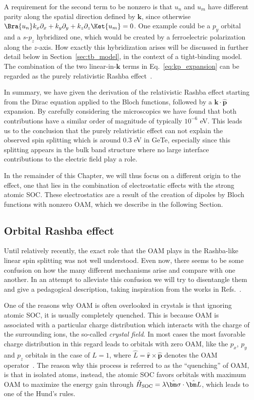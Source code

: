A requirement for the second term to be nonzero is that $u_n$ and $u_m$ have different parity along the spatial direction defined by $\bm{k}$, since otherwise $\Bra{u_n} k_x \partial_x + k_y \partial_y + k_z \partial_z \Ket{u_m} = 0$.
One example could be a $p_y$ orbital and a $s$-$p_z$ hybridized one, which would be created by a ferroelectric polarization along the $z$-axis.
How exactly this hybridization arises will be discussed in further detail below in Section~\ref{sec:tb_model}, in the context of a tight-binding model.
The combination of the two linear-in-$\bm{k}$ terms in Eq.~\eqref{eq:kp_expansion} can be regarded as the purely relativistic Rashba effect~\cite{Bahramy2011}.
    
In summary, we have given the derivation of the relativistic Rashba effect starting from the Dirac equation applied to the Bloch functions, followed by a $\bm k \cdot \hat{\bm p}$ expansion.
By carefully considering the microscopics we have found that both contributions have a similar order of magnitude of typically $10^{-6}$ eV.
This leads us to the conclusion that the purely relativistic effect can not explain the observed spin splitting which is around 0.3 eV in GeTe, especially since this splitting appears in the bulk band structure where no large interface contributions to the electric field play a role.

In the remainder of this Chapter, we will thus focus on a different origin to the effect, one that lies in the combination of electrostatic effects with the strong atomic \gls{SOC}.
These electrostatics are a result of the creation of dipoles by Bloch functions with nonzero \gls{OAM}, which we describe in the following Section. 
\subsection{Orbital Rashba effect}
Until relatively recently, the exact role that the \gls{OAM} plays in the Rashba-like linear spin splitting was not well understood. Even now, there seems to be some confusion on how the many different mechanisms arise and compare with one another.   
In an attempt to alleviate this confusion we will try to disentangle them and give a pedagogical description, taking inspiration from the works in Refs.~\cite{Petersen2000,Park2011,Park2012,Kim2014,Park2015,Go2016}.
    
One of the reasons why \gls{OAM} is often overlooked in crystals is that ignoring atomic \gls{SOC}, it is usually completely quenched.
This is because \gls{OAM} is associated with a particular charge distribution which interacts with the charge of the surrounding ions, the so-called {\it crystal field}.
In most cases the most favorable charge distribution in this regard leads to orbitals with zero \gls{OAM}, like the $p_x$, $p_y$ and $p_z$ orbitals in the case of $L=1$, where $\hat{L} = \hat{\bm r} \times \hat{\bm p}$ denotes the \gls{OAM} operator~\cite{Ballhausen}.
The reason why this process is referred to as the ``quenching'' of \gls{OAM}, is that in isolated atoms, instead, the atomic \gls{SOC} favors orbitals with maximum \gls{OAM} to maximize the energy gain through $\hat{H}_{\rm SOC} = \lambda \hat{\bm \sigma} \cdot \hat{\bm L}$, which leads to one of the Hund's rules.
    

